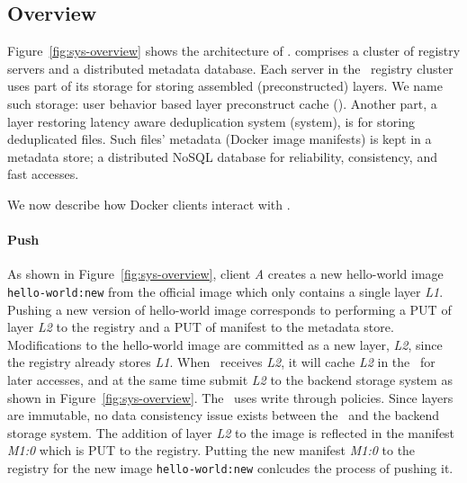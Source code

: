 \vspace{-4pt}
\subsection{Overview}
\label{sec:design}
\vspace{-4pt}



Figure~\ref{fig:sys-overview} shows the architecture of \sysname.
 \sysname comprises a cluster of registry servers and a distributed metadata database. 
Each server in the \sysname~registry cluster uses part of its storage for storing assembled (\ie preconstructed) layers. 
We name such storage: user behavior based layer preconstruct cache (\preconstructcachename).
Another part, a layer restoring latency aware deduplication system (\dedupname system), is for storing deduplicated files. 
Such files' metadata (\eg Docker image manifests) is kept in a metadata store; a distributed NoSQL database for 
reliability, consistency, and fast accesses.

We now describe how Docker clients interact with \sysname.

\paragraph{Push}
As shown in Figure~\ref{fig:sys-overview}, 
client \textit{A} creates a new hello-world image
\texttt{hello-world:new}
from the official image which only contains a single layer \textit{L1}. 
Pushing a new version of hello-world image corresponds to performing a PUT of layer \textit{L2} to the registry and a PUT of manifest to the metadata store. 
Modifications to the hello-world image are committed as a new layer, \textit{L2}, since the registry already stores \textit{L1}.
When \sysname~receives \textit{L2}, 
it will cache \textit{L2} in the \preconstructcachename~for later accesses,
and at the same time submit \textit{L2} to the backend storage system as shown in Figure~\ref{fig:sys-overview}.
The \preconstructcachename~uses write through policies. 
Since layers are immutable, no data consistency issue exists between the \preconstructcachename~and the backend storage system.
The addition of layer \textit{L2} to the image is reflected in the manifest \textit{M1:0} which is PUT to the registry.
Putting the new manifest \textit{M1:0} to the registry for the new image \texttt{hello-world:new} conlcudes the process of pushing it.



